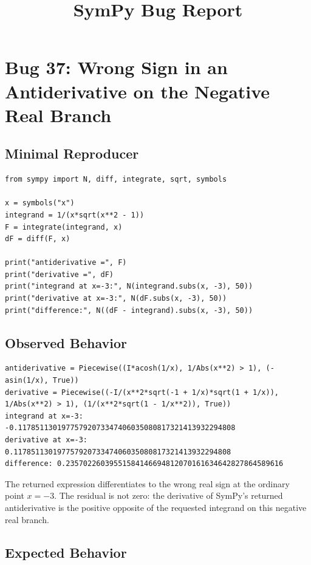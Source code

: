 \documentclass[11pt]{article}
\title{SymPy Bug Report}
\date{}
\begin{document}
\author{}
\maketitle

\section{Bug 37: Wrong Sign in an Antiderivative on the Negative Real Branch}

\subsection{Minimal Reproducer}

\medskip

\begin{lstlisting}[style=bugpython]
from sympy import N, diff, integrate, sqrt, symbols

x = symbols("x")
integrand = 1/(x*sqrt(x**2 - 1))
F = integrate(integrand, x)
dF = diff(F, x)

print("antiderivative =", F)
print("derivative =", dF)
print("integrand at x=-3:", N(integrand.subs(x, -3), 50))
print("derivative at x=-3:", N(dF.subs(x, -3), 50))
print("difference:", N((dF - integrand).subs(x, -3), 50))
\end{lstlisting}

\subsection{Observed Behavior}

\medskip

\begin{lstlisting}[style=bugpython]
antiderivative = Piecewise((I*acosh(1/x), 1/Abs(x**2) > 1), (-asin(1/x), True))
derivative = Piecewise((-I/(x**2*sqrt(-1 + 1/x)*sqrt(1 + 1/x)), 1/Abs(x**2) > 1), (1/(x**2*sqrt(1 - 1/x**2)), True))
integrand at x=-3: -0.11785113019775792073347406035080817321413932294808
derivative at x=-3: 0.11785113019775792073347406035080817321413932294808
difference: 0.23570226039551584146694812070161634642827864589616
\end{lstlisting}

The returned expression differentiates to the wrong real sign at the ordinary
point \(x=-3\).  The residual is not zero: the derivative of SymPy's returned
antiderivative is the positive opposite of the requested integrand on this
negative real branch.

\subsection{Expected Behavior}
\end{document}
